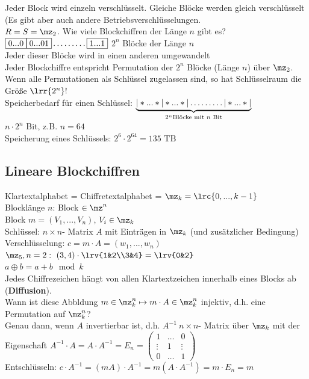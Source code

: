 	Jeder Block wird einzeln verschlüsselt. Gleiche Blöcke werden gleich verschlüsselt (Es gibt aber auch andere Betriebsverschlüsselungen.\\
	$R=S=\mz_2$. Wie viele Blockchiffren der Länge $n$ gibt es?\\
	$\fbox{0...0}\fbox{0...01}\dots\dots\dots\fbox{1...1}$ $2^n$ Blöcke der Länge $n$\\
	Jeder dieser Blöcke wird in einen anderen umgewandelt\\
	Jeder Blockchiffre entspricht Permutation der $2^n$ Blöcke (Länge $n$) über $\mz_2$.\\
	Wenn alle Permutationen als Schlüssel zugelassen sind, so hat Schlüsselraum die Größe $\lrr{2^n}!$\\
Speicherbedarf für einen Schlüssel: $\underbrace{|*...*|*...*|\dots\dots\dots|*...*|}_{2^n\mbox{\scriptsize Blöcke mit }n\mbox{\scriptsize\ Bit}}$\\
	$n\cdot 2^n$ Bit, z.B. $n=64$\\
	Speicherung eines Schlüssels: $2^6\cdot 2^64=135\mbox{ TB}$
	
	\subsection{Lineare Blockchiffren}
		Klartextalphabet = Chiffretextalphabet = $\mz_k=\lrc{0,...,k-1}$\\
		Blocklänge $n$: Block $\in\mz^n$\\
		Block $m=(V_1,...,V_n)$, $V_i\in\mz_k$\\
		Schlüssel: $n\times n$- Matrix $A$ mit Einträgen in $\mz_k$ (und zusätzlicher Bedingung)\\
		Verschlüsselung: $c=m\cdot A=(w_1,...,w_n)$\\
		$\mz_5,n=2:\ (3,4)\cdot\lrv{1&2\\3&4}=\lrv{0&2}$\\
		$a\oplus b=a+b\mod k$\\
		Jedes Chiffrezeichen hängt von allen Klartextzeichen innerhalb eines Blocks ab\\(\textbf{Diffusion}).\\
		Wann ist diese Abbldung $m\in\mz_k^n\mapsto m\cdot A\in\mz_k^n$ injektiv, d.h. eine Permutation auf $\mz_k^n$?\\
		Genau dann, wenn $A$ invertierbar ist, d.h. $A^{-1}\ n\times n$- Matrix über $\mz_k$ mit der Eigenschaft $A^{-1}\cdot A=A\cdot A^{-1}=E_n=\begin{pmatrix}1&\dots&0\\\vdots&1&\vdots\\0&\dots&1\end{pmatrix}$\\
		Entschlüsseln: $c\cdot A^{-1}=(mA)\cdot A^{-1}=m(A\cdot A^{-1})=m\cdot E_n=m$
		
